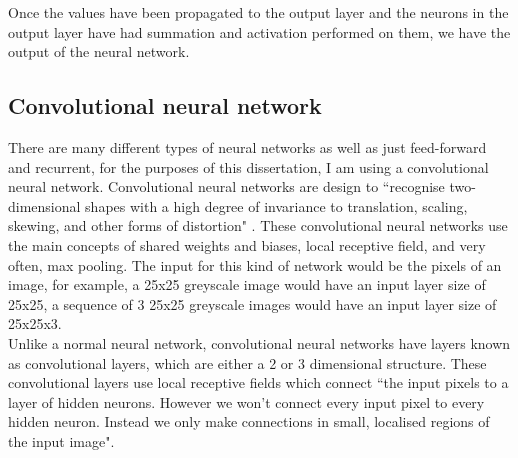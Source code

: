\documentclass[10pt]{article}
\begin{document}
		Once the values have been propagated to the output layer and the neurons in the output layer have had summation and activation performed on them, we have the output of the neural network.\\
		
		\medskip
		
		\subsection{Convolutional neural network}
		
		 There are many different types of neural networks as well as just feed-forward and recurrent, for the purposes of this dissertation, I am using a convolutional neural network. Convolutional neural networks are design to ``recognise two-dimensional shapes with a high degree of invariance to translation, scaling, skewing, and other forms of distortion" \cite{nncomp}. These convolutional neural networks use the main concepts of shared weights and biases, local receptive field, and very often, max pooling. The input for this kind of network would be the pixels of an image, for example, a 25x25 greyscale image would have an input layer size of 25x25, a sequence of 3 25x25 greyscale images would have an input layer size of 25x25x3.\\
		 
		 Unlike a normal neural network, convolutional neural networks have layers known as convolutional layers, which are either a 2 or 3 dimensional structure. These convolutional layers use local receptive fields which connect ``the input pixels to a layer of hidden neurons. However we won't connect every input pixel to every hidden neuron. Instead we only make connections in small, localised regions of the input image"\cite{nndl}.\\
		 
\end{document}
